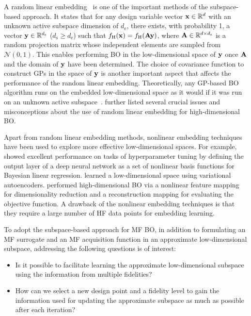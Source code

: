 \documentclass[journal ]{new-aiaa}
\begin{document}
	A random linear embedding~\citep{WangZ2016} is one of the important methods of the subspace-based approach.
	It states that for any design variable vector ${\bf x} \in \mathbb{R}^d$ with an unknown active subspace dimension of $d_\text{e}$, there exists, with probability 1, a vector ${\bf y} \in \mathbb{R}^{d_\text{s}}$ ($d_\text{s} \geq d_\text{e}$) such that $f_\text{H}({\bf x}) = f_\text{H}({\bf Ay})$, where ${\bf A} \in \mathbb{R}^{d \times d_\text{s}}$ is a random projection matrix whose independent elements are sampled from $\mathcal{N}(0,1)$.
	This enables performing BO in the low-dimensional space of ${\bf y}$ once ${\bf A}$ and the domain of ${\bf y}$ have been determined.
	The choice of covariance function to construct GPs in the space of ${\bf y}$ is another important aspect that affects the performance of the random linear embedding. 
	Theoretically, any GP-based BO algorithm runs on the embedded low-dimensional space as it would if it was run on an unknown active subspace~\citep{Nayebi2019}.
	\citet{Letham2020} further listed several crucial issues and misconceptions about the use of random linear embedding for high-dimensional BO.
	
	Apart from random linear embedding methods, nonlinear embedding techniques have been used to explore more effective low-dimensional spaces.
	For example, \citet{Snoek2015} showed excellent performance on tasks of hyperparameter tuning by defining the output layer of a deep neural network as a set of nonlinear basis functions for Bayesian linear regression.
	\citet{GomezBombarelli2018} learned a low-dimensional space using variational autoencoders.
	\citet{Moriconi2020} performed high-dimensional BO via a nonlinear feature mapping for dimensionality reduction and a reconstruction mapping for evaluating the objective function. 
	A drawback of the nonlinear embedding techniques is that they require a large number of HF data points for embedding learning.
	
	To adopt the subspace-based approach for MF BO, in addition to formulating an MF surrogate and an MF acquisition function in an approximate low-dimensional subspace, addressing the following questions is of interest: 
	\begin{itemize}
		\item Is it possible to facilitate learning the approximate low-dimensional subspace using the information from multiple fidelities?
		
		\item How can we select a new design point and a fidelity level to gain the information used for updating the approximate subspace as much as possible after each iteration?
	\end{itemize}
	
\end{document}
